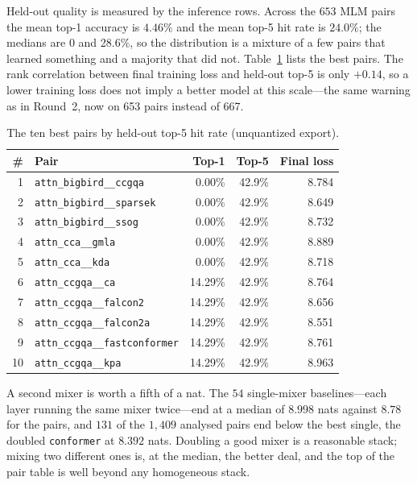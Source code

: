 Held-out quality is measured by the inference rows. Across the $653$ MLM pairs the mean top-1 accuracy is $4.46\%$ and the mean top-5 hit rate is $24.0\%$; the medians are 0 and 28.6\%, so the distribution is a mixture of a few pairs that learned something and a majority that did not. Table~\ref{tab:r3-top-inference} lists the best pairs. The rank correlation between final training loss and held-out top-5 is only $+0.14$, so a lower training loss does not imply a better model at this scale---the same warning as in Round~2, now on 653 pairs instead of 667.

\begin{table}[H]
\centering
\small
\caption{The ten best pairs by held-out top-5 hit rate (unquantized export).}
\label{tab:r3-top-inference}
\begin{tabular}{rlrrr}
\toprule
\# & Pair & Top-1 & Top-5 & Final loss \\
\midrule
1 & \texttt{attn\_bigbird\_\_ccgqa} & 0.00\% & 42.9\% & 8.784 \\
2 & \texttt{attn\_bigbird\_\_sparsek} & 0.00\% & 42.9\% & 8.649 \\
3 & \texttt{attn\_bigbird\_\_ssog} & 0.00\% & 42.9\% & 8.732 \\
4 & \texttt{attn\_cca\_\_gmla} & 0.00\% & 42.9\% & 8.889 \\
5 & \texttt{attn\_cca\_\_kda} & 0.00\% & 42.9\% & 8.718 \\
6 & \texttt{attn\_ccgqa\_\_ca} & 14.29\% & 42.9\% & 8.764 \\
7 & \texttt{attn\_ccgqa\_\_falcon2} & 14.29\% & 42.9\% & 8.656 \\
8 & \texttt{attn\_ccgqa\_\_falcon2a} & 14.29\% & 42.9\% & 8.551 \\
9 & \texttt{attn\_ccgqa\_\_fastconformer} & 14.29\% & 42.9\% & 8.761 \\
10 & \texttt{attn\_ccgqa\_\_kpa} & 14.29\% & 42.9\% & 8.963 \\
\bottomrule
\end{tabular}
\end{table}

A second mixer is worth a fifth of a nat. The $54$ single-mixer baselines---each layer running the same mixer twice---end at a median of $8.998$ nats against $8.78$ for the pairs, and $131$ of the $1{,}409$ analysed pairs end below the best single, the doubled \texttt{conformer} at $8.392$ nats. Doubling a good mixer is a reasonable stack; mixing two different ones is, at the median, the better deal, and the top of the pair table is well beyond any homogeneous stack.

